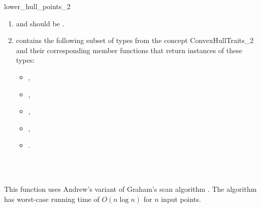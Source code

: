 \begin{ccRefFunction}{lower_hull_points_2}
\begin{enumerate}
   \item    {} and 
            should be .
   \item    {} contains the following subset of types from
            the concept ConvexHullTraits\_2 and their corresponding member
            functions that return instances of these types:
            \begin{itemize}
                \item {},
                \item {}, 
                \item {},
                \item {}, 
                \item {}.
            \end{itemize}
\end{enumerate}


\ccSeeAlso

 \\
 \\

\ccImplementation

This function uses Andrew's variant of Graham's scan algorithm 
\cite{a-aeach-79,m-mdscg-84}.  The algorithm has worst-case running time 
of $O(n \log n)$ for $n$ input points.

\end{ccRefFunction}


